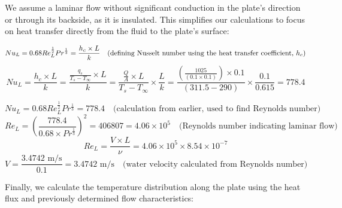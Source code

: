 \documentclass{article}
\numberwithin{equation}{section}
\begin{document}
\noindent
We assume a laminar flow without significant conduction in the plate's direction or through its backside, as it is insulated. This simplifies our calculations to focus on heat transfer directly from the fluid to the plate's surface:

\begin{equation}
Nu_{L} = 0.68 Re_{L}^{\frac{1}{2}} Pr^{\frac{1}{3}} = \frac{h_{c} \times L}{k} \quad \text{(defining Nusselt number using the heat transfer coefficient, \( h_c \))}
\end{equation}
\begin{equation}
Nu_{L} = \frac{h_{c} \times L}{k} = \frac{\frac{q_{s}}{T_{s} - T_{\infty}} \times L}{k} = \frac{\frac{Q}{A} \times L}{T_{s} - T_{\infty}} \times \frac{L}{k} = \frac{\left( \frac{1025}{(0.1 \times 0.1)} \right) \times 0.1}{(311.5 - 290)} \times \frac{0.1}{0.615} = 778.4
\end{equation}

\begin{equation}
Nu_{L} = 0.68 Re_{L}^{\frac{1}{2}} Pr^{\frac{1}{3}} = 778.4 \quad \text{(calculation from earlier, used to find Reynolds number)}
\end{equation}
\begin{equation}
Re_{L} = \left( \frac{778.4}{0.68 \times Pr^{\frac{1}{3}}} \right)^{2} = 406807 = 4.06 \times 10^{5} \quad \text{(Reynolds number indicating laminar flow)}
\end{equation}
\begin{equation}
Re_{L} = \frac{V \times L}{\nu} = 4.06 \times 10^{5} \times 8.54 \times 10^{-7}
\end{equation}
\begin{equation}
V = \frac{3.4742 \text{ m/s}}{0.1} = 3.4742 \text{ m/s} \quad \text{(water velocity calculated from Reynolds number)}
\end{equation}

\noindent
Finally, we calculate the temperature distribution along the plate using the heat flux and previously determined flow characteristics:
\end{document}
